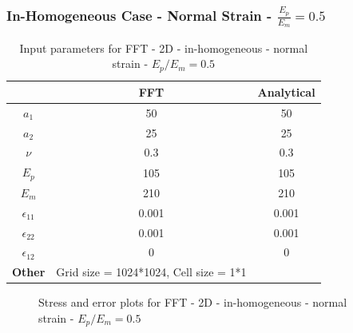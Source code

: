 \documentclass[12pt, a4paper]{report}
\begin{document}
\newpage
\subsubsection{In-Homogeneous Case - Normal Strain - $\frac{E_p}{E_m} = 0.5$}
\begin{table}[H]
    \centering
    \begin{tabular}{|c|c|c|}
        \hline
        & \textbf{FFT} &\textbf{Analytical}\\
        \hline
        \textbf{$a_1$} & 50 & 50 \\
        \hline
        \textbf{$a_2$} & 25 & 25 \\
        \hline
        \textbf{$\nu$} & 0.3 & 0.3 \\
        \hline
        \textbf{$E_p$} & 105 & 105 \\
        \hline
        \textbf{$E_m$} & 210 & 210 \\
        \hline
        \textbf{$\epsilon_{11}$} & 0.001 & 0.001 \\
        \hline
        \textbf{$\epsilon_{22}$} & 0.001 & 0.001 \\
        \hline
        \textbf{$\epsilon_{12}$} & 0 & 0 \\
        \hline
        \textbf{Other} & Grid size = 1024*1024, Cell size = 1*1 &  \\
        \hline
    \end{tabular}
    \caption{Input parameters for FFT - 2D - in-homogeneous - normal strain - $E_p / E_m = 0.5$}
\end{table}

\begin{figure}[htbp]
  \centering
  \hfill
  \caption{Stress and error plots for FFT - 2D - in-homogeneous - normal strain - $E_p / E_m = 0.5$}
\end{figure}
\end{document}
